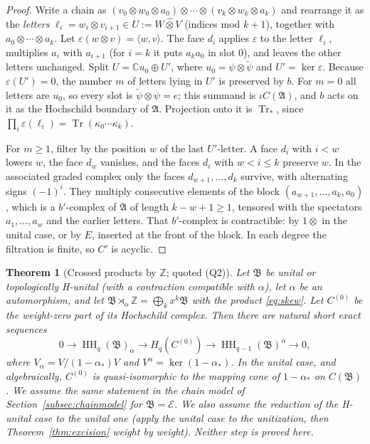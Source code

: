 \documentclass[11pt,oneside,reqno]{article}
\DeclareMathOperator{\HH}{HH}
\newcommand{\C}{\mathbb C}
\newcommand{\Z}{\mathbb Z}
\DeclareMathOperator{\Tr}{Tr}
\newcommand{\cE}{\mathcal E}
\theoremstyle{plain}
\newtheorem{theorem}{Theorem}[section]
\theoremstyle{definition}
\theoremstyle{remark}
\begin{document}
\begin{proof}
Write a chain as
\((v_0\otimes w_0\otimes a_0)\otimes\cdots\otimes(v_k\otimes w_k\otimes a_k)\)
and rearrange it as the \emph{letters} \(\ell_i=w_i\otimes v_{i+1}\in
U:=W\widehat\otimes V\) (indices mod \(k+1\)), together with
\(a_0\otimes\cdots\otimes a_k\). Let \(\varepsilon(w\otimes v)=\langle w,v
\rangle\). The face \(d_i\) applies \(\varepsilon\) to the letter
\(\ell_i\), multiplies \(a_i\) with \(a_{i+1}\) (for \(i=k\) it puts
\(a_ka_0\) in slot \(0\)), and leaves the other letters unchanged. Split
\(U=\C u_0\oplus U'\), where \(u_0=\psi\otimes\tilde\psi\) and
\(U'=\ker\varepsilon\). Because \(\varepsilon(U')=0\), the number \(m\) of
letters lying in \(U'\) is preserved by \(b\). For \(m=0\) all letters are
\(u_0\), so every slot is \(\tilde\psi\otimes\psi=e\); this summand is
\(\iota C(\mathfrak A)\), and \(b\) acts on it as the Hochschild boundary
of \(\mathfrak A\). Projection onto it is \(\Tr_*\), since
\(\prod_i\varepsilon(\ell_i)=\Tr(\kappa_0\cdots\kappa_k)\).

For \(m\geq1\), filter by the position \(w\) of the last \(U'\)-letter. A
face \(d_i\) with \(i<w\) lowers \(w\), the face \(d_w\) vanishes, and the
faces \(d_i\) with \(w<i\leq k\) preserve \(w\). In the associated graded
complex only the faces \(d_{w+1},\dots,d_k\) survive, with alternating
signs \((-1)^i\). They multiply consecutive elements of the block
\((a_{w+1},\dots,a_k,a_0)\), which is a \(b'\)-complex of \(\mathfrak A\) of
length \(k-w+1\geq1\), tensored with the spectators \(a_1,\dots,a_w\) and
the earlier letters. That \(b'\)-complex is contractible: by \(1\otimes\)
in the unital case, or by \(E\), inserted at the front of the block. In
each degree the filtration is finite, so \(C'\) is acyclic.
\end{proof}

\begin{theorem}[Crossed products by \(\Z\); quoted (Q2)]\label{thm:crossed}
Let \(\mathfrak B\) be unital or topologically H-unital (with a
contraction compatible with \(\alpha\)), let \(\alpha\) be an automorphism,
and let \(\mathfrak B\rtimes_\alpha\Z=\bigoplus_kx^k\mathfrak B\) with the
product \eqref{eq:skew}. Let \(C^{(0)}\) be the weight-zero part of its
Hochschild complex. Then there are natural short exact sequences
\[
 0\to\HH_q(\mathfrak B)_\alpha\to H_q(C^{(0)})\to
 \HH_{q-1}(\mathfrak B)^\alpha\to0,
\]
where \(V_\alpha=V/(1-\alpha_*)V\) and \(V^\alpha=\ker(1-\alpha_*)\). In the
unital case, and algebraically, \(C^{(0)}\) is quasi-isomorphic to the
mapping cone of \(1-\alpha_*\) on \(C(\mathfrak B)\)
\cite{FeiginTsygan,NistorCrossed,GetzlerJones}. We assume the same
statement in the chain model of Section~\ref{subsec:chainmodel} for
\(\mathfrak B=\cE\). We also assume the reduction of the H-unital case to
the unital one (apply the unital case to the unitization, then
Theorem~\ref{thm:excision} weight by weight). Neither step is proved here.
\end{theorem}
\end{document}
